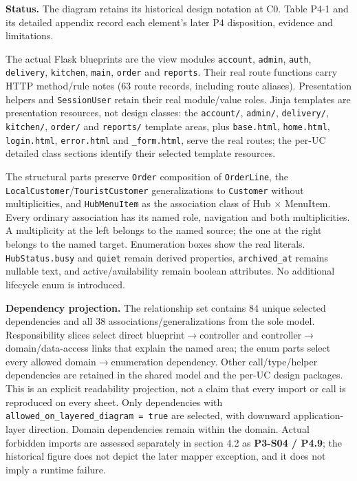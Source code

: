 \textbf{Status.} The diagram retains its historical design notation at C0. Table P4-1 and its detailed appendix record each element's later P4 disposition, evidence and limitations.

The actual Flask blueprints are the \guillemotleft{}view\guillemotright{} modules \texttt{account}, \texttt{admin}, \texttt{auth}, \texttt{delivery}, \texttt{kitchen}, \texttt{main}, \texttt{order} and \texttt{reports}. Their real route functions carry HTTP method/rule notes (63 route records, including route aliases). Presentation helpers and \texttt{SessionUser} retain their real module/value roles. Jinja templates are presentation resources, not design classes: the \texttt{account/\allowbreak{}}, \texttt{admin/\allowbreak{}}, \texttt{delivery/\allowbreak{}}, \texttt{kitchen/\allowbreak{}}, \texttt{order/\allowbreak{}} and \texttt{reports/\allowbreak{}} template areas, plus \texttt{base.\allowbreak{}html}, \texttt{home.\allowbreak{}html}, \texttt{login.\allowbreak{}html}, \texttt{error.\allowbreak{}html} and \texttt{\_\allowbreak{}form.\allowbreak{}html}, serve the real routes; the per-UC detailed class sections identify their selected template resources.

The structural parts preserve \texttt{Order} composition of \texttt{OrderLine}, the \texttt{LocalCustomer}/\texttt{TouristCustomer} generalizations to \texttt{Customer} without multiplicities, and \texttt{HubMenuItem} as the association class of Hub \ensuremath{\times} MenuItem. Every ordinary association has its named role, navigation and both multiplicities. A multiplicity at the left belongs to the named source; the one at the right belongs to the named target. Enumeration boxes show the real literals. \texttt{HubStatus.\allowbreak{}busy} and \texttt{quiet} remain derived properties, \texttt{archived\_\allowbreak{}at} remains nullable text, and active/availability remain boolean attributes. No additional lifecycle enum is introduced.

\textbf{Dependency projection.} The relationship set contains 84 unique selected dependencies and all 38 associations/generalizations from the sole model. Responsibility slices select direct blueprint\ensuremath{\rightarrow}controller and controller\ensuremath{\rightarrow}domain/data-access links that explain the named area; the enum parts select every allowed domain\ensuremath{\rightarrow}enumeration dependency. Other call/type/helper dependencies are retained in the shared model and the per-UC design packages. This is an explicit readability projection, not a claim that every import or call is reproduced on every sheet. Only dependencies with \texttt{allowed\_\allowbreak{}on\_\allowbreak{}layered\_\allowbreak{}diagram = true} are selected, with downward application-layer direction. Domain dependencies remain within the domain. Actual forbidden imports are assessed separately in section 4.2 as \textbf{P3-S04 / P4.9}; the historical figure does not depict the later mapper exception, and it does not imply a runtime failure.

